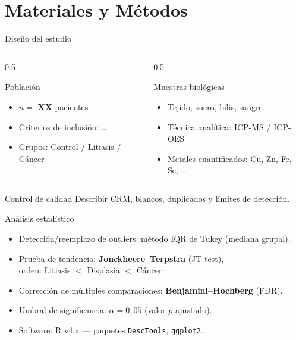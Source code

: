 \documentclass[aspectratio=169, 11pt]{beamer}
\begin{document}
\section{Materiales y Métodos}

\begin{frame}{Diseño del estudio}
  \begin{columns}[T]
    \begin{column}{0.5\textwidth}
      \begin{block}{Población}
        \begin{itemize}
          \item $n = $ \textbf{XX} pacientes
          \item Criterios de inclusión: \ldots
          \item Grupos: Control / Litiasis / Cáncer
        \end{itemize}
      \end{block}
    \end{column}
    \begin{column}{0.5\textwidth}
      \begin{block}{Muestras biológicas}
        \begin{itemize}
          \item Tejido, suero, bilis, sangre
          \item Técnica analítica: ICP-MS / ICP-OES
          \item Metales cuantificados: Cu, Zn, Fe, Se, \ldots
        \end{itemize}
      \end{block}
    \end{column}
  \end{columns}

  \vspace{0.6em}
  \begin{alertblock}{Control de calidad}
    Describir CRM, blancos, duplicados y límites de detección.
  \end{alertblock}
\end{frame}

\begin{frame}{Análisis estadístico}
  \begin{itemize}
    \item Detección/reemplazo de outliers: método IQR de Tukey (mediana grupal).
    \item Prueba de tendencia: \textbf{Jonckheere–Terpstra} (JT test),\\
          orden: Litiasis $<$ Displasia $<$ Cáncer.
    \item Corrección de múltiples comparaciones: \textbf{Benjamini–Hochberg} (FDR).
    \item Umbral de significancia: $\alpha = 0{,}05$ (valor $p$ ajustado).
    \item Software: \textsf{R} v4.x — paquetes \texttt{DescTools}, \texttt{ggplot2}.
  \end{itemize}
\end{frame}
\end{document}
